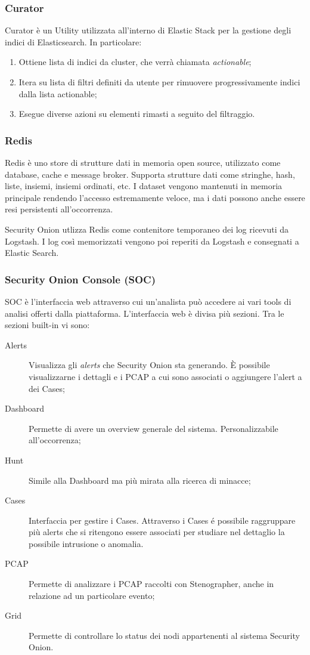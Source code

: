 \subsubsection*{Curator}
Curator \cite{curator} è un Utility utilizzata all'interno di Elastic Stack per la gestione degli indici di Elasticsearch. In particolare: 
\begin{enumerate}
    \item Ottiene lista di indici da cluster, che verrà chiamata \textit{actionable};
    \item Itera su lista di filtri definiti da utente per rimuovere progressivamente indici dalla lista actionable;
    \item Esegue diverse azioni su elementi rimasti a seguito del filtraggio.
\end{enumerate}

\subsubsection*{Redis}
Redis \cite{redis} è uno store di strutture dati in memoria open source, utilizzato come database, cache e message broker. Supporta strutture dati come stringhe, hash, liste, insiemi, insiemi ordinati, etc.
I  dataset vengono mantenuti in memoria principale rendendo l'accesso estremamente veloce, ma i dati possono anche essere resi persistenti all'occorrenza.

Security Onion utlizza Redis come contenitore temporaneo dei log ricevuti da Logstash. I log così memorizzati vengono poi reperiti da Logstash e consegnati a Elastic Search.

\subsubsection*{Security Onion Console (SOC)}
SOC è l'interfaccia web attraverso cui un'analista può accedere ai vari tools di analisi offerti dalla piattaforma.
L'interfaccia web è divisa più sezioni.
Tra le sezioni built-in vi sono:
\begin{description}
    \item[Alerts] Visualizza gli \textit{alerts} che Security Onion sta generando. È possibile visualizzarne i dettagli e i PCAP a cui sono associati o aggiungere l'alert a dei Cases;
    \item[Dashboard] Permette di avere un overview generale del sistema. Personalizzabile all'occorrenza;
    \item[Hunt] Simile alla Dashboard ma più mirata alla ricerca di minacce;
    \item[Cases] Interfaccia per gestire i Cases. Attraverso i Cases é possibile raggruppare più alerts che si ritengono essere associati per studiare nel dettaglio la possibile intrusione o anomalia.
    \item[PCAP] Permette di analizzare i PCAP raccolti con Stenographer, anche in relazione ad un particolare evento;
    \item[Grid] Permette di controllare lo status dei nodi appartenenti al sistema Security Onion.
\end{description}

